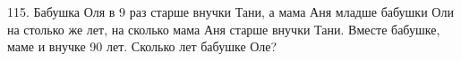 115. Бабушка Оля в 9 раз старше внучки Тани, а мама Аня младше бабушки Оли на столько же лет, на сколько мама Аня старше внучки Тани. Вместе бабушке, маме и внучке 90 лет. Сколько лет бабушке Оле?\\
